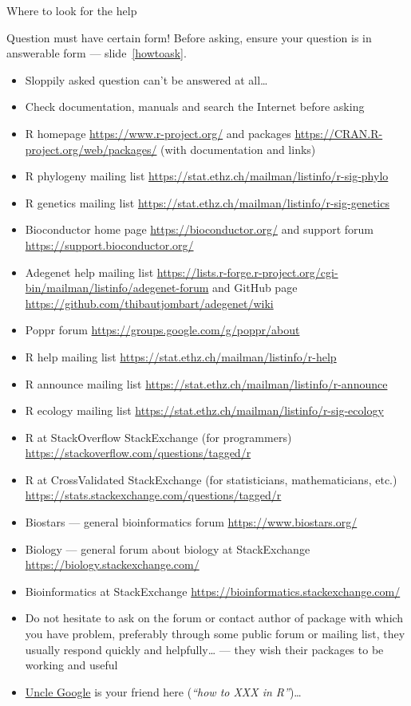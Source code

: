 \documentclass[compress, ucs, xelatex, 11pt, xcolor=svgnames, aspectratio=169,
	hyperref={
		bookmarks=true,
		unicode=true,
		colorlinks=true,
		pdftitle={Molecular data in R},
		plainpages=false,
		pdfauthor={Vojtech Zeisek},
		pdfsubject={Course about phylogeny and evolution in R},
		pdfcreator={XeLaTeX},
		pdfkeywords={R, evolution, phylogeny, molecular data},
		linkcolor=Crimson, %
		anchorcolor=Magenta, %
		citecolor=Magenta, %
		filecolor=Magenta, %
		menucolor=Magenta, %
		urlcolor=DodgerBlue, %
		pdftex},
	url={hyphens, lowtilde} %
	]{beamer}
\begin{document}
\begin{frame}[allowframebreaks]{Where to look for the help}
	\label{help}
	\begin{alertblock}{Question must have certain form!}
			Before asking, \alert{ensure your question is in answerable form} --- slide~\ref{howtoask}.
		\begin{itemize}
			\item Sloppily asked question can't be answered at all\ldots
			\item Check documentation, manuals and search the Internet before asking
		\end{itemize}
	\end{alertblock}
	\begin{itemize}
		\item R homepage \url{https://www.r-project.org/} and packages \url{https://CRAN.R-project.org/web/packages/} (with documentation and links)
		\item R phylogeny mailing list \url{https://stat.ethz.ch/mailman/listinfo/r-sig-phylo}
		\item R genetics mailing list \url{https://stat.ethz.ch/mailman/listinfo/r-sig-genetics}
		\item Bioconductor home page \url{https://bioconductor.org/} and support forum \url{https://support.bioconductor.org/}
		\item Adegenet help mailing list \url{https://lists.r-forge.r-project.org/cgi-bin/mailman/listinfo/adegenet-forum} and GitHub page \url{https://github.com/thibautjombart/adegenet/wiki}
		\item Poppr forum \url{https://groups.google.com/g/poppr/about}
		\item R help mailing list \url{https://stat.ethz.ch/mailman/listinfo/r-help}
		\item R announce mailing list \url{https://stat.ethz.ch/mailman/listinfo/r-announce}
		\item R ecology mailing list \url{https://stat.ethz.ch/mailman/listinfo/r-sig-ecology}
		\item R at StackOverflow StackExchange (for programmers) \url{https://stackoverflow.com/questions/tagged/r}
		\item R at CrossValidated StackExchange (for statisticians, mathematicians, etc.) \url{https://stats.stackexchange.com/questions/tagged/r}
		\item Biostars --- general bioinformatics forum \url{https://www.biostars.org/}
		\item Biology --- general forum about biology at StackExchange \url{https://biology.stackexchange.com/}
		\item Bioinformatics at StackExchange \url{https://bioinformatics.stackexchange.com/}
		\item Do not hesitate to ask on the forum or contact author of package with which you have problem, preferably through some public forum or mailing list, they usually respond quickly and helpfully\ldots{ }--- they wish their packages to be working and useful
		\item \href{https://rseek.org/}{Uncle Google} is your friend here (\textit{\enquote{how to XXX in R}})\ldots
	\end{itemize}
\end{frame}
\end{document}
